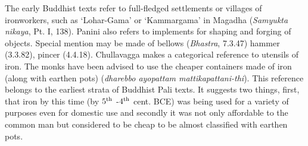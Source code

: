\vspace{.05cm}

The early Buddhist texts refer to full-fledged settlements or villages of ironworkers, such as `Lohar-Gama' or `Kammargama' in Magadha ({\it Samyukta nikaya}, Pt. I, 138). Panini also refers to implements for shaping and forging of objects. Special mention may be made of bellows ({\it Bhastra}, 7.3.47) hammer (3.3.82), pincer (4.4.18).  Chullavagga makes a categorical reference to utensils of iron. The monks have been advised to use the cheaper containers made of iron (along with earthen pots) ({\it dharebbo ayopattam mattikapattani-thi}). This reference belongs to the earliest strata of Buddhist Pali texts. It suggests two things, first, that iron by this time (by $5^{\rm th}$ -$4^{\rm th}$ cent. BCE) was being used for a variety of purposes even for domestic use and secondly it was not only affordable to the common man but considered to be cheap to be almost classified with earthen pots. 

\vspace{.05cm}


